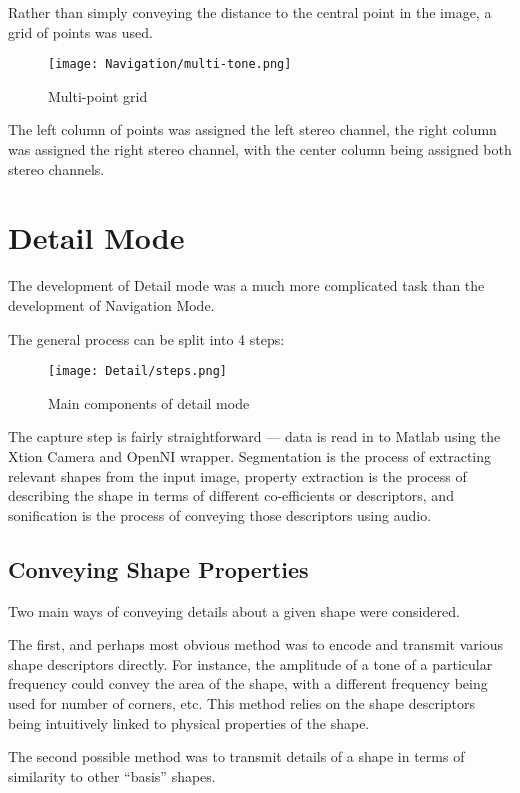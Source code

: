 Rather than simply conveying the distance to the central point in the image, a grid of points was used.

\begin{figure}[H]
    \centering
    \texttt{[image: Navigation/multi-tone.png]}
    \caption{Multi-point grid}
\end{figure}

The left column of points was assigned the left stereo channel, the right column was assigned the right stereo channel, with the center column being assigned both stereo channels. 

\section{Detail Mode}
\label{sec:detail}
The development of Detail mode was a much more complicated task than the development of Navigation Mode.

The general process can be split into 4 steps:

\begin{figure}[H]
    \centering
    \texttt{[image: Detail/steps.png]}
    \caption{Main components of detail mode}
\end{figure}

The capture step is fairly straightforward --- data is read in to Matlab using the Xtion Camera and OpenNI wrapper. Segmentation is the process of extracting relevant shapes from the input image, property extraction is the process of describing the shape in terms of different co-efficients or descriptors, and sonification is the process of conveying those descriptors using audio. 

\subsection{Conveying Shape Properties}
Two main ways of conveying details about a given shape were considered.

The first, and perhaps most obvious method was to encode and transmit various shape descriptors directly. For instance, the amplitude of a tone of a particular frequency could convey the area of the shape, with a different frequency being used for number of corners, etc. This method relies on the shape descriptors being intuitively linked to physical properties of the shape.

The second possible method was to transmit details of a shape in terms of similarity to other ``basis'' shapes.

